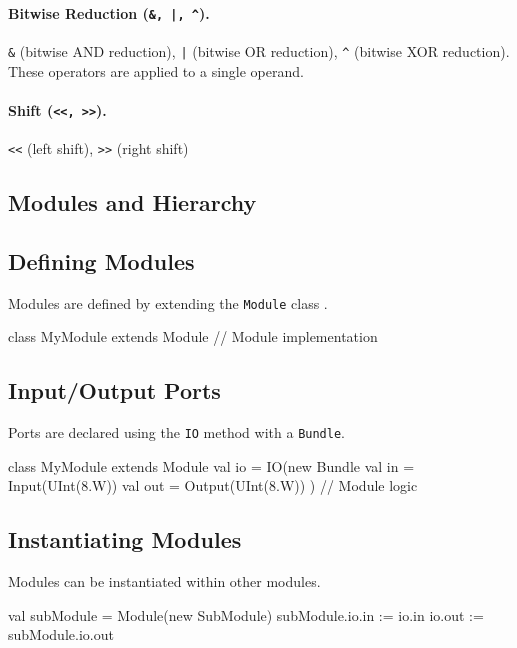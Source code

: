 \paragraph{Bitwise Reduction (\texttt{\&, |, \^}).} \texttt{\&} (bitwise AND reduction), \texttt{|} (bitwise OR reduction), \texttt{\^{}} (bitwise XOR reduction). These operators are applied to a single operand.

\paragraph{Shift (\texttt{<<, >>}).} \texttt{<<} (left shift), \texttt{>>} (right shift)

\subsection{Modules and Hierarchy}
\subsection{Defining Modules}
Modules are defined by extending the \texttt{Module} class \cite{chisel-doc}.

\begin{chiselcode}
class MyModule extends Module {
  // Module implementation
}    
\end{chiselcode}

\subsection{Input/Output Ports}
Ports are declared using the \texttt{IO} method with a \texttt{Bundle}.
\begin{chiselcode}
class MyModule extends Module {
  val io = IO(new Bundle {
    val in  = Input(UInt(8.W))
    val out = Output(UInt(8.W))
  })
  // Module logic
}    
\end{chiselcode}

\subsection{Instantiating Modules}
Modules can be instantiated within other modules.
\begin{chiselcode}
val subModule = Module(new SubModule)
subModule.io.in := io.in
io.out := subModule.io.out
\end{chiselcode}


